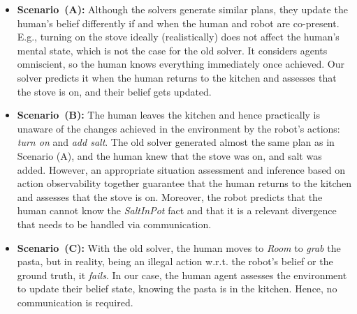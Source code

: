 \documentclass[letterpaper]{article} %
\begin{document}
\begin{itemize}
    \item \textbf{Scenario~(A):} 
    Although the solvers generate similar plans, they update the human's belief differently if and when the human and robot are co-present. E.g., turning on the stove ideally (realistically) does not affect the human's mental state, which is not the case for the old solver. It considers agents omniscient, so the human knows everything immediately once achieved. 
    Our solver predicts it when the human returns to the kitchen and assesses that the stove is {\sc on}, and their belief gets updated.
    \item \textbf{Scenario~(B):} The human leaves the kitchen and hence practically is unaware of the changes achieved in the environment by the robot's actions: {\em turn on} and {\em add salt}. The old solver generated almost the same plan as in Scenario (A), and the human knew that the stove was {\sc on}, and salt was added.
    However, an appropriate situation assessment and inference based on action observability together guarantee that the human returns to the kitchen and assesses that the stove is {\sc on}. Moreover, the robot predicts that the human cannot know the \textit{SaltInPot} fact and that it is a relevant divergence that needs to be handled via communication. 
    \item
    \textbf{Scenario~(C):}
    With the old solver, the human moves to \textit{Room} to \textit{grab} the pasta, but in reality, being an illegal action w.r.t. the robot's belief or the ground truth, it \textit{fails}. 
    In our case, the human agent assesses the environment to update their belief state, knowing the pasta is in the kitchen. 
    Hence, no communication is required.
\end{itemize}
\end{document}
